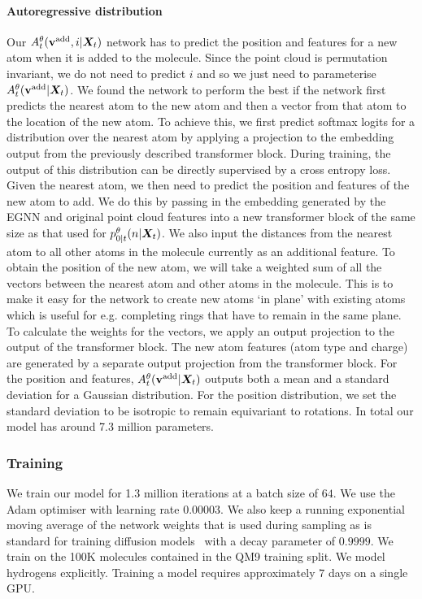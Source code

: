 \paragraph{Autoregressive distribution}
Our $A_t^\theta({\mathbf{v}}^{\textup{add}}, i | {\bm{X}}_t)$ network has to predict the position and features for a new atom when it is added to the molecule. Since the point cloud is permutation invariant, we do not need to predict $i$ and so we just need to parameterise $A_t^\theta({\mathbf{v}}^{\textup{add}} | {\bm{X}}_t)$. We found the network to perform the best if the network first predicts the nearest atom to the new atom and then a vector from that atom to the location of the new atom. To achieve this, we first predict softmax logits for a distribution over the nearest atom by applying a projection to the embedding output from the previously described transformer block. During training, the output of this distribution can be directly supervised by a cross entropy loss. Given the nearest atom, we then need to predict the position and features of the new atom to add. We do this by passing in the embedding generated by the EGNN and original point cloud features into a new transformer block of the same size as that used for $p_{0|t}^\theta(n | {\bm{X}}_t)$. We also input the distances from the nearest atom to all other atoms in the molecule currently as an additional feature. To obtain the position of the new atom, we will take a weighted sum of all the vectors between the nearest atom and other atoms in the molecule. This is to make it easy for the network to create new atoms `in plane' with existing atoms which is useful for e.g. completing rings that have to remain in the same plane. To calculate the weights for the vectors, we apply an output projection to the output of the transformer block. The new atom features (atom type and charge) are generated by a separate output projection from the transformer block. For the position and features, $A_t^\theta({\mathbf{v}}^{\textup{add}} | {\bm{X}}_t)$ outputs both a mean and a standard deviation for a Gaussian distribution. For the position distribution, we set the standard deviation to be isotropic to remain equivariant to rotations. In total our model has around 7.3 million parameters.

\subsubsection{Training}
We train our model for 1.3 million iterations at a batch size of $64$. We use the Adam optimiser with learning rate $0.00003$. We also keep a running exponential moving average of the network weights that is used during sampling as is standard for training diffusion models~\citep{ho2020denoising, song2020score, karras2022elucidating} with a decay parameter of $0.9999$. We train on the 100K molecules contained in the QM9 training split. We model hydrogens explicitly. Training a model requires approximately $7$ days on a single GPU.

